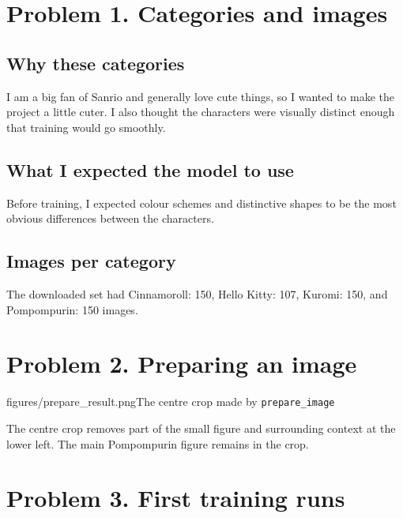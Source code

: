 \documentclass[11pt]{article}
\begin{document}
\makeheader

\section*{Problem 1. Categories and images}

\subsection*{Why these categories}
I am a big fan of Sanrio and generally love cute things, so I wanted to make
the project a little cuter. I also thought the characters were visually
distinct enough that training would go smoothly.

\subsection*{What I expected the model to use}
Before training, I expected colour schemes and distinctive shapes to be the
most obvious differences between the characters.

\subsection*{Images per category}
The downloaded set had Cinnamoroll: 150, Hello Kitty: 107, Kuromi: 150, and
Pompompurin: 150 images.

\section*{Problem 2. Preparing an image}

           {figures/prepare_result.png}{The centre crop made by \texttt{prepare\_image}}

The centre crop removes part of the small figure and surrounding context at
the lower left. The main Pompompurin figure remains in the crop.

\section*{Problem 3. First training runs}
\end{document}
